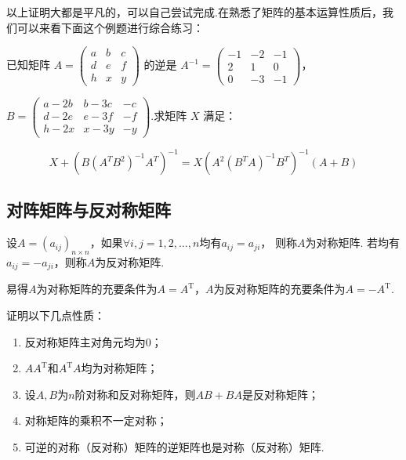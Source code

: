 以上证明大都是平凡的，可以自己尝试完成.在熟悉了矩阵的基本运算性质后，我们可以来看下面这个例题进行综合练习：
\begin{example}
    已知矩阵 $A=\begin{pmatrix}a & b & c \\ d & e & f \\ h & x & y\end{pmatrix}$ 的逆是 $A^{-1}=\begin{pmatrix}-1 & -2 & -1 \\ 2 & 1 & 0 \\ 0 & -3 & -1\end{pmatrix}$，

$B=\begin{pmatrix}a-2b & b-3c & -c \\ d-2e & e-3f & -f \\ h-2x & x-3y & -y\end{pmatrix}$.求矩阵 $X$ 满足：

\[X+\left(B(A^TB^2)^{-1}A^T\right)^{-1}=X\left(A^2(B^TA)^{-1}B^T\right)^{-1}(A+B)\]
\end{example}

\subsection{对阵矩阵与反对称矩阵}
\begin{definition}
    设$A=(a_{ij})_{n \times n}$，如果$\forall i,j=1,2,\ldots,n$均有$a_{ij}=a_{ji}$，
    则称$A$为对称矩阵. 若均有$a_{ij}=-a_{ji}$，则称$A$为反对称矩阵.
\end{definition}
易得$A$为对称矩阵的充要条件为$A=A^\mathrm{T}$，$A$为反对称矩阵的充要条件为$A=-A^\mathrm{T}$.
\begin{example}
    证明以下几点性质：
    \begin{enumerate}
        \item 反对称矩阵主对角元均为0；

        \item $AA^\mathrm{T}$和$A^\mathrm{T}A$均为对称矩阵；

        \item 设$A,B$为$n$阶对称和反对称矩阵，则$AB+BA$是反对称矩阵；

        \item 对称矩阵的乘积不一定对称；

        \item 可逆的对称（反对称）矩阵的逆矩阵也是对称（反对称）矩阵.
    \end{enumerate}
\end{example}

